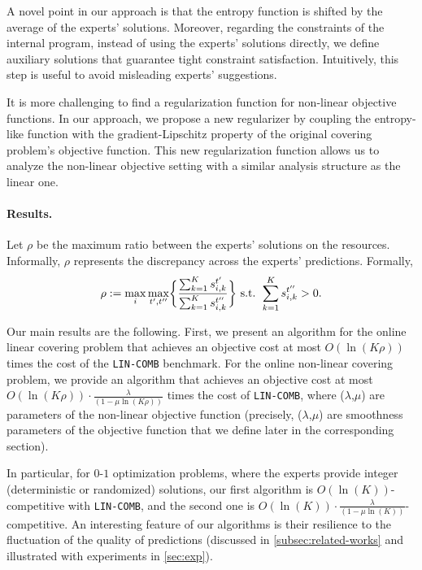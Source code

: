 A novel point in our approach is that the entropy function is shifted by the average of the experts' solutions.
Moreover, regarding the constraints of the internal program, instead of using the experts' solutions directly,
we define auxiliary solutions that guarantee tight constraint satisfaction.
Intuitively, this step is useful to avoid misleading experts' suggestions.

It is more challenging to find a regularization function for non-linear objective functions. 
In our approach, we propose a new regularizer by coupling the entropy-like function with the gradient-Lipschitz property of the original covering problem's objective function.
This new regularization function allows us to analyze the non-linear objective setting with a similar analysis structure as the linear one.

\paragraph{Results.} Let $\rho$ be the maximum ratio between the experts' solutions on the resources. 
Informally, $\rho$ represents the discrepancy across the experts' predictions.
Formally,
\[
	\rho := \max_{i} \max_{t',t''} \biggl\{\frac{\sum_{k=1}^{K} s_{i,k}^{t'}}{\sum_{k=1}^{K} s_{i,k}^{t''}} \biggr\}  \textnormal{ s.t. } \sum_{k=1}^{K} s_{i,k}^{t''} > 0.
\]

Our main results are the following.
First, we present an algorithm for the online linear covering problem that achieves an objective cost at most $O(\ln(K\rho))$ times the cost of the \texttt{LIN-COMB} benchmark. 
For the online non-linear covering problem, we provide an algorithm that achieves an objective cost at most $O(\ln(K\rho)) \cdot \frac{\lambda}{(1-\mu\ln(K\rho))}$ times the cost of \texttt{LIN-COMB}, where ($\lambda$,$\mu$) are parameters of the non-linear objective function (precisely, ($\lambda$,$\mu$) are smoothness parameters of the objective function that we define later in the corresponding section).

In particular, for $0$-$1$ optimization problems, where the experts provide integer (deterministic or randomized) solutions, our first algorithm is $O(\ln(K))$-competitive with \texttt{LIN-COMB}, and the second one is $O(\ln(K)) \cdot \frac{\lambda}{(1-\mu\ln(K))}$-competitive.
An interesting feature of our algorithms is their resilience to the fluctuation of the quality of predictions (discussed in \cref{subsec:related-works} and illustrated with experiments in \cref{sec:exp}).


